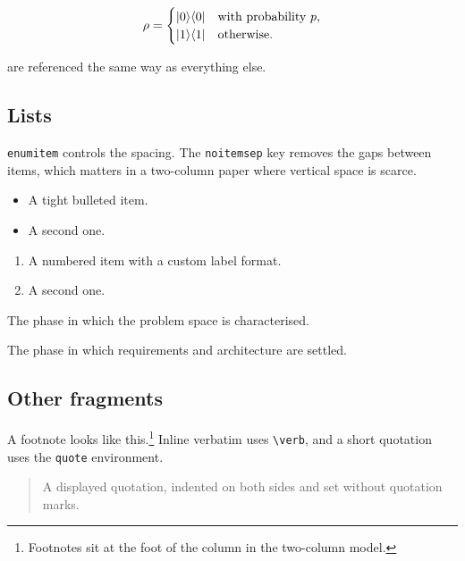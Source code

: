 \[
  \rho = \begin{cases}
    \lvert 0 \rangle\langle 0 \rvert & \text{with probability } p, \\
    \lvert 1 \rangle\langle 1 \rvert & \text{otherwise.}
  \end{cases}
\]

 are referenced the same way as everything else.

\subsection{Lists}
\verb|enumitem| controls the spacing.
The \verb|noitemsep| key removes the gaps between items, which matters in a two-column paper where vertical space is scarce.

\begin{itemize}[noitemsep]
  \item A tight bulleted item.
  \item A second one.
\end{itemize}

\begin{enumerate}[label=(\roman*),noitemsep]
  \item A numbered item with a custom label format.
  \item A second one.
\end{enumerate}

\begin{description}[noitemsep]
  \item[Concept] The phase in which the problem space is characterised.
  \item[Definition] The phase in which requirements and architecture are settled.
\end{description}

\subsection{Other fragments}
A footnote looks like this.\footnote{Footnotes sit at the foot of the column in the two-column model.}
Inline verbatim uses \verb|\verb|, and a short quotation uses the \verb|quote| environment.

\begin{quote}
  A displayed quotation, indented on both sides and set without quotation marks.
\end{quote}
